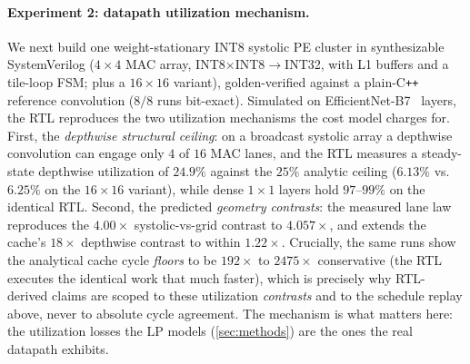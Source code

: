 \paragraph{Experiment 2: datapath utilization mechanism.}
We next build one weight-stationary INT8 systolic PE cluster in synthesizable
SystemVerilog ($4\times4$ MAC array, INT8$\times$INT8$\rightarrow$INT32, with
L1 buffers and a tile-loop FSM; plus a $16\times16$ variant), golden-verified
against a plain-C\texttt{++} reference convolution ($8/8$ runs bit-exact).
Simulated on EfficientNet-B7~\citep{tan2019efficientnet} layers, the RTL
reproduces the two utilization mechanisms the cost model charges for. First, the
\emph{depthwise structural ceiling}: on a broadcast systolic array a depthwise
convolution can engage only $4$ of $16$ MAC lanes, and the RTL measures a
steady-state depthwise utilization of $24.9\%$ against the $25\%$ analytic
ceiling ($6.13\%$ vs.\ $6.25\%$ on the $16\times16$ variant), while dense
$1\times1$ layers hold $97$--$99\%$ on the identical RTL. Second, the
predicted \emph{geometry contrasts}: the measured lane law reproduces the
$4.00\times$ systolic-vs-grid contrast to $4.057\times$, and extends the
cache's $18\times$ depthwise contrast to within $1.22\times$. Crucially, the
same runs show the analytical cache cycle \emph{floors} to be $192\times$ to
$2475\times$ conservative (the RTL executes the identical work that much
faster), which is precisely why RTL-derived claims are scoped to these
utilization \emph{contrasts} and to the schedule replay above, never to
absolute cycle agreement. The mechanism is what matters here: the utilization
losses the LP models (\cref{sec:methods}) are the ones the real datapath
exhibits.

